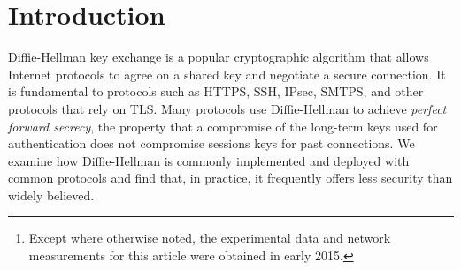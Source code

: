 \begin{abstract}
We investigate the security of Diffie-Hellman key exchange as used in popular
Internet protocols and find it to be less secure than widely believed. First,
we present Logjam, a novel flaw in TLS that lets a man-in-the-middle
downgrade connections to ``export-grade'' Diffie-Hellman. To carry out this
attack, we implement the number field sieve discrete log algorithm. After a
week-long precomputation\footnote{\small Except where otherwise noted, the
experimental data and network measurements for this article were obtained in
early 2015.} for a specified 512-bit group, we can compute arbitrary discrete
logs in that group in about a minute. We find that 82\% of vulnerable servers
use a single 512-bit group, allowing us to compromise connections to 7\% of
Alexa Top Million HTTPS sites. In response, major browsers have changed to
reject short groups.

We go on to consider Diffie-Hellman with 768- and 1024-bit groups. We
estimate that even in the 1024-bit case, the computations are plausible given
nation-state resources. A small number of fixed or standardized groups are
used by millions of servers; performing precomputation for a single 1024-bit
group would allow passive eavesdropping on 18\% of popular HTTPS sites, and a
second group would allow decryption of traffic to 66\% of IPsec VPNs and 26\%
of SSH servers. A close reading of published NSA leaks shows that the
agency's attacks on VPNs are consistent with having achieved such a break. We
conclude that moving to stronger key exchange methods should be a priority
for the Internet community.

\end{abstract}

\section{Introduction}

Diffie-Hellman key exchange is a popular cryptographic algorithm that allows
Internet protocols to agree on a shared key and negotiate a secure
connection. It is fundamental to protocols such as HTTPS, SSH, IPsec, SMTPS,
and other protocols that rely on TLS\@. Many protocols use Diffie-Hellman to
achieve \emph{perfect forward secrecy}, the property that a compromise of the
long-term keys used for authentication does not compromise sessions keys for
past connections. We examine how Diffie-Hellman is commonly implemented and
deployed with common protocols and find that, in practice, it frequently
offers less security than widely believed.

